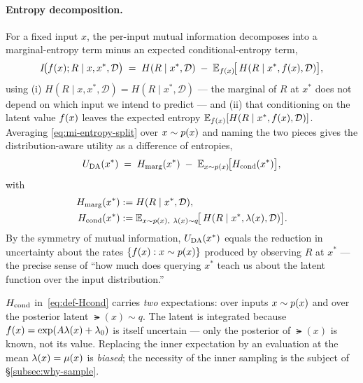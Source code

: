\paragraph{Entropy decomposition.}
For a fixed input $x$, the per-input mutual information decomposes into a
marginal-entropy term minus an expected conditional-entropy term,
%
\begin{equation}
  I\!\big(f(x);R\mid x,x^{*},\mathcal D\big)
  \;=\;
  H(R\mid x^{*},\mathcal D)
  \;-\;
  \mathbb{E}_{f(x)}\!\big[\,H(R\mid x^{*},f(x),\mathcal D)\big],
  \label{eq:mi-entropy-split}
\end{equation}
%
using (i) $H(R\mid x,x^{*},\mathcal D)=H(R\mid x^{*},\mathcal D)$ --- the marginal
of $R$ at $x^{*}$ does not depend on which input we intend to predict --- and
(ii) that conditioning on the latent value $f(x)$ leaves the expected entropy
$\mathbb{E}_{f(x)}[H(R\mid x^{*},f(x),\mathcal D)]$. Averaging
\eqref{eq:mi-entropy-split} over $x\sim p(x)$ and naming the two pieces gives the
distribution-aware utility as a difference of entropies,
%
\begin{equation}
  U_{\mathrm{DA}}(x^{*}) \;=\; H_{\mathrm{marg}}(x^{*}) \;-\; \mathbb{E}_{x\sim p(x)}\!\big[H_{\mathrm{cond}}(x^{*})\big],
  \label{eq:Uda}
\end{equation}
%
with
%
\begin{align}
  H_{\mathrm{marg}}(x^{*}) &:= H(R\mid x^{*},\mathcal D), \label{eq:def-Hmarg-cond}\\
  H_{\mathrm{cond}}(x^{*}) &:= \mathbb{E}_{x\sim p(x),\ \lambda(x)\sim q}\!\big[\,H(R\mid x^{*},\lambda(x),\mathcal D)\big].
  \label{eq:def-Hcond}
\end{align}
%
By the symmetry of mutual information, $U_{\mathrm{DA}}(x^{*})$ equals the reduction in
uncertainty about the rates $\{f(x):x\sim p(x)\}$ produced by observing $R$ at
$x^{*}$ --- the precise sense of ``how much does querying $x^{*}$ teach us about the
latent function over the input distribution.''

\begin{remark}\label{rem:double-exp}
$H_{\mathrm{cond}}$ in~\eqref{eq:def-Hcond} carries \emph{two} expectations: over inputs
$x\sim p(x)$ and over the posterior latent $\lat(x)\sim q$. The latent is integrated
because $f(x)=\exp(A\lambda(x)+\lambda_{0})$ is itself uncertain --- only the
posterior of $\lat(x)$ is known, not its value. Replacing the inner expectation by
an evaluation at the mean $\lambda(x)=\mu(x)$ is \emph{biased}; the necessity of the
inner sampling is the subject of \S\ref{subsec:why-sample}.
\end{remark}

